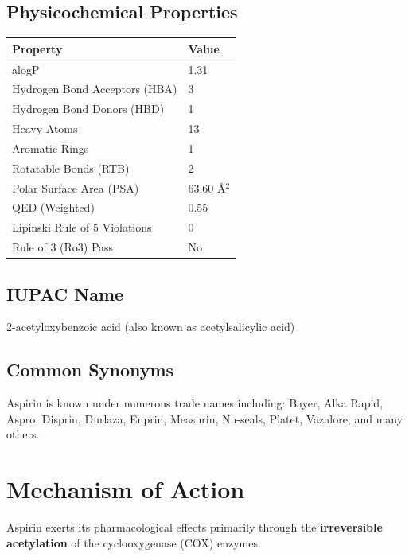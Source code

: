 \documentclass[11pt, a4paper]{article}
\begin{document}
\subsection{Physicochemical Properties}
\begin{table}[h!]
\centering
\begin{tabular}{ll}
\toprule
\textbf{Property} & \textbf{Value} \\
\midrule
alogP & 1.31 \\
Hydrogen Bond Acceptors (HBA) & 3 \\
Hydrogen Bond Donors (HBD) & 1 \\
Heavy Atoms & 13 \\
Aromatic Rings & 1 \\
Rotatable Bonds (RTB) & 2 \\
Polar Surface Area (PSA) & 63.60 \AA$^2$ \\
QED (Weighted) & 0.55 \\
Lipinski Rule of 5 Violations & 0 \\
Rule of 3 (Ro3) Pass & No \\
\bottomrule
\end{tabular}
\end{table}

\subsection{IUPAC Name}
2-acetyloxybenzoic acid (also known as acetylsalicylic acid)

\subsection{Common Synonyms}
Aspirin is known under numerous trade names including: Bayer, Alka Rapid, Aspro, Disprin, Durlaza, Enprin, Measurin, Nu-seals, Platet, Vazalore, and many others.

\section{Mechanism of Action}
Aspirin exerts its pharmacological effects primarily through the \textbf{irreversible acetylation} of the cyclooxygenase (COX) enzymes. 
\end{document}
